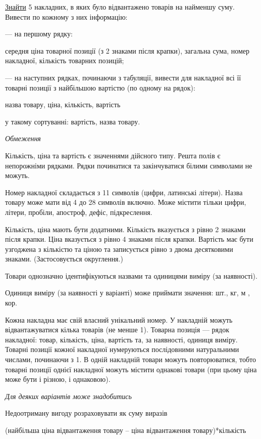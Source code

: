 \documentclass[11pt, ukrainian]{article}
\begin{document}
\underline{Знайти} 5 накладних, в яких було відвантажено товарів на найменшу суму. Вивести по кожному з них інформацію:\par
{\noindent}--- на першому рядку:\par
середня ціна товарної позиції (з 2 знаками після крапки), загальна сума, номер накладної, кількість товарних позицій;

{\noindent}--- на наступних рядках, починаючи з табуляції, вивести для накладної всі її товарні позиції з найбільшою вартістю (по одному на рядок):\par
назва товару, ціна, кількість, вартість

{\noindent}у такому сортуванні: вартість, назва товару.


\bigskip\textit{Обмеження}

Кількість, ціна та вартість є значеннями дійсного типу.
Решта полів є непорожніми рядками.
Рядки починатися та закінчуватися білими символами не можуть.

Номер накладної складається з 11 символів (цифри, латинські літери).
Назва товару може мати від 4 до 28 символів включно.
Може містити тільки цифри, літери, пробіли, апостроф, дефіс, підкреслення.

Кількість, ціна мають бути додатними.
Кількість вказується з рівно 2 знаками після крапки.
Ціна вказується з рівно 4 знаками після крапки.
Вартість має бути узгоджена з кількістю та ціною та записується рівно з двома десятковими знаками.
(Застосовується округлення.)

Товари однозначно ідентифікуються назвами та одиницями виміру (за наявності).

Одиниця виміру (за наявності у варіанті) може приймати значення: шт., кг, м , кор.

Кожна накладна має свій власний унікальний номер.
У накладній можуть відвантажуватися кілька товарів (не менше 1).
Товарна позиція --- рядок накладної: товар, кількість, ціна, вартість та, за наявності, одиниця виміру.
Товарні позиції кожної накладної нумеруються послідовними натуральними числами, починаючи з 1.
В одній накладній товари можуть повторюватися, 
тобто товарні позиції однієї накладної можуть містити однакові товари 
(при цьому ціна може бути і різною, і однаковою).

\bigskip\textit{Для деяких варіантів може знадобитись}

Недоотриману вигоду розраховувати як суму виразів
{\center (найбільша ціна відвантаження товару – ціна відвантаження товару)*кількість\par}
\end{document}

